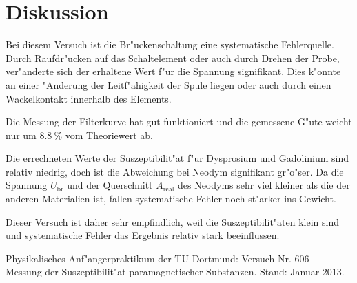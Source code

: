 \section{Diskussion}
	\label{diskussion}

	Bei diesem Versuch ist die Br"uckenschaltung eine systematische Fehlerquelle.
	Durch Raufdr"ucken auf das Schaltelement oder auch durch Drehen der Probe, ver"anderte sich der erhaltene Wert f"ur die Spannung signifikant.
	Dies k"onnte an einer "Anderung der Leitf"ahigkeit der Spule liegen oder auch durch einen Wackelkontakt innerhalb des Elements.

	Die Messung der Filterkurve hat gut funktioniert und die gemessene G"ute weicht nur um $\SI{8.8}{\%}$ vom Theoriewert ab.

	Die errechneten Werte der Suszeptibilit"at f"ur Dysprosium und Gadolinium sind relativ niedrig, doch ist die Abweichung bei Neodym signifikant gr"o"ser.
	Da die Spannung $U_\mathrm{br}$ und der Querschnitt $A_\mathrm{real}$ des Neodyms sehr viel kleiner als die der anderen Materialien ist, fallen systematische Fehler noch st"arker ins Gewicht.

	Dieser Versuch ist daher sehr empfindlich, weil die Suszeptibilit"aten klein sind und systematische Fehler das Ergebnis relativ stark beeinflussen.


\begin{thebibliography}{9}
	 Physikalisches Anf"angerpraktikum der TU Dortmund: Versuch Nr. 606 - Messung der Suszeptibilit"at paramagnetischer Substanzen. Stand: Januar 2013.

\end{thebibliography}

